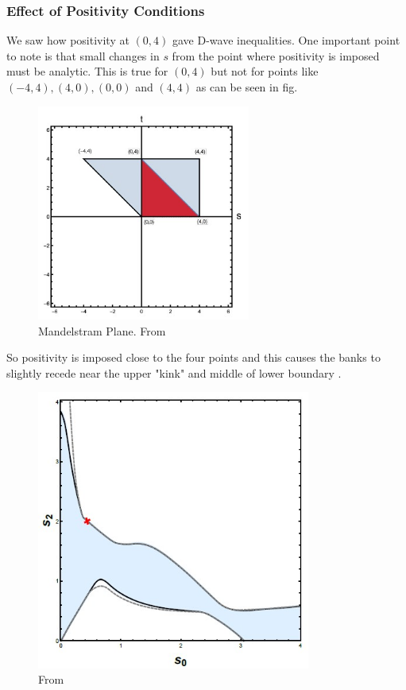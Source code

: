 ﻿\documentclass[12pt,a4paper]{article}
\begin{document}
\subsubsection{Effect of Positivity Conditions}
We saw how positivity at $(0,4)$ gave D-wave inequalities. One important point to note is that small changes in $s$ from the point where positivity is imposed must be analytic. This is true for $(0,4)$ but not for points like $(-4, 4), (4, 0), (0, 0)$ and $(4, 4)$ as can be seen in fig.
\begin{figure}[H]
  \centering
  \includegraphics[width=7cm]{12.jpg}
  \caption{Mandelstram Plane. From \cite{7}}
  \label{fig:1}
\end{figure}
So positivity is imposed close to the four points and this causes the banks to slightly recede near the upper "kink" and middle of lower boundary \cite{7}.
\begin{figure}[H]
  \centering
  \includegraphics[width=9cm]{13.jpg}
  \caption{From \cite{7}}
  \label{fig:1}
\end{figure}
\end{document}
